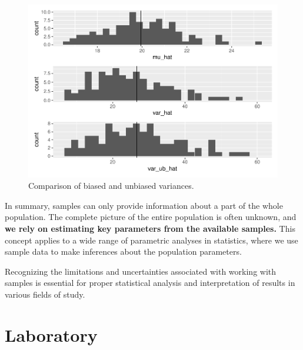 \documentclass[
]{book}
\begin{document}
\begin{figure}

{\centering \includegraphics{biostats_files/figure-latex/var-ub-1} 

}

\caption{Comparison of biased and unbiased variances.}\label{fig:var-ub}
\end{figure}

In summary, samples can only provide information about a part of the whole population. The complete picture of the entire population is often unknown, and \textbf{we rely on estimating key parameters from the available samples.} This concept applies to a wide range of parametric analyses in statistics, where we use sample data to make inferences about the population parameters.

Recognizing the limitations and uncertainties associated with working with samples is essential for proper statistical analysis and interpretation of results in various fields of study.

\hypertarget{laboratory-1}{%
\section{Laboratory}\label{laboratory-1}}
\end{document}
